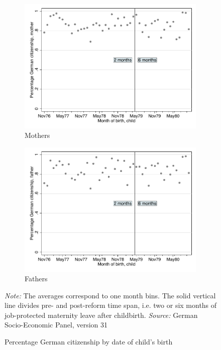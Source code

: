\documentclass[a4paper ]{article}
\begin{document}
\newpage
\vspace*{\fill}
\begin{figure}[h]
	\centering
	\begin{subfigure}[h]{0.48\textwidth}
		\centering
		\includegraphics[width=0.99\textwidth]{../../analysis/graphs/SOEP/D_mcitizen.pdf}
		\caption{Mothers}		
	\end{subfigure}
	\quad
	\begin{subfigure}[h]{0.48\textwidth}
		\centering
		\includegraphics[width=0.99\textwidth]{../../analysis/graphs/SOEP/D_fcitizen.pdf}
		\caption{Fathers}
	\end{subfigure}
	\caption{Percentage German citizenship by date of child's birth}\label{fig:citizen_all cohorts}
	\begin{minipage}{\textwidth} %
{\footnotesize \textit{Note:} The averages correspond to one month bins. The solid vertical line divides pre- and post-reform time span, i.e. two or six months of job-protected maternity leave after childbirth. \newline \textit{Source: }German Socio-Economic Panel, version 31\par}
\end{minipage}
\end{figure}
\end{document}
